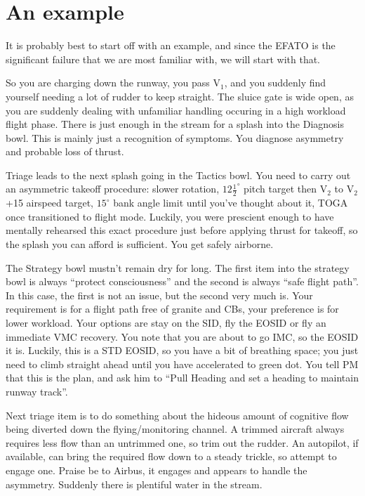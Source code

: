 \documentclass[a4paper,12pt]{article}
\begin{document}
\section{An example}

It is probably best to start off with an example, and since the EFATO is
the significant failure that we are most familiar with, we will start
with that.

So you are charging down the runway, you pass V$_1$, and you suddenly
find yourself needing a lot of rudder to keep straight. The sluice gate
is wide open, as you are suddenly dealing with unfamiliar handling
occuring in a high workload flight phase. There is just enough in the
stream for a splash into the Diagnosis bowl. This is mainly just a
recognition of symptoms. You diagnose asymmetry and probable loss of
thrust.

Triage leads to the next splash going in the Tactics bowl. You need to
carry out an asymmetric takeoff procedure: slower rotation,
$12\frac{1}{2}^{\circ}$ pitch target then V$_2$ to V$_2$+15 airspeed
target, $15^{\circ}$ bank angle limit until you've thought about it,
TOGA once transitioned to flight mode. Luckily, you were prescient
enough to have mentally rehearsed this exact procedure just before
applying thrust for takeoff, so the splash you can afford is
sufficient. You get safely airborne.

The Strategy bowl mustn't remain dry for long. The first item into the
strategy bowl is always ``protect consciousness'' and the second is
always ``safe flight path''. In this case, the first is not an issue,
but the second very much is. Your requirement is for a flight path free
of granite and CBs, your preference is for lower workload. Your options
are stay on the SID, fly the EOSID or fly an immediate VMC recovery. You
note that you are about to go IMC, so the EOSID it is. Luckily, this is
a STD EOSID, so you have a bit of breathing space; you just need to
climb straight ahead until you have accelerated to green dot. You tell
PM that this is the plan, and ask him to ``Pull Heading and set a
heading to maintain runway track''.

Next triage item is to do something about the hideous amount of
cognitive flow being diverted down the flying/monitoring channel. A
trimmed aircraft always requires less flow than an untrimmed one, so
trim out the rudder. An autopilot, if available, can bring the required
flow down to a steady trickle, so attempt to engage one. Praise be to
Airbus, it engages and appears to handle the asymmetry. Suddenly there
is plentiful water in the stream.
\end{document}
